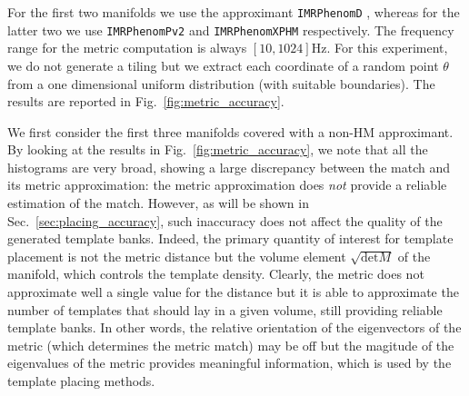 \documentclass[twocolumn,showpacs,preprintnumbers,nofootinbib,prd,
superscriptaddress,10pt]{revtex4-2}
\newcommand{\stefano}[1]{{\textcolor{blue}{\texttt{SS: #1}} }}
\begin{document}
For the first two manifolds we use the approximant \texttt{IMRPhenomD} \cite{PhysRevD.93.044006, PhysRevD.93.044007}, whereas for the latter two we use \texttt{IMRPhenomPv2} \cite{PhysRevLett.113.151101} and \texttt{IMRPhenomXPHM} \cite{PhysRevD.103.104056} respectively.
The frequency range for the metric computation is always $[10, 1024]\text{Hz}$.
For this experiment, we do not generate a tiling but we extract each coordinate of a random point $\theta$ from a one dimensional uniform distribution (with suitable boundaries).
The results are reported in Fig.~\ref{fig:metric_accuracy}.

We first consider the first three manifolds covered with a non-HM approximant.
By looking at the results in Fig.~\ref{fig:metric_accuracy}, we note that all the histograms are very broad, showing a large discrepancy between the match and its metric approximation: the metric approximation does {\it not} provide a reliable estimation of the match. 
However, as will be shown in Sec.~\ref{sec:placing_accuracy}, such inaccuracy does not affect the quality of the generated template banks. Indeed, the primary quantity of interest for template placement is not the metric distance but the volume element $\sqrt{\text{det}M}$ of the manifold, which controls the template density. Clearly, the metric does not approximate well a single value for the distance but it is able to approximate the number of templates that should lay in a given volume, still providing reliable template banks.
In other words, the relative orientation of the eigenvectors of the metric (which determines the metric match) may be off but the magitude of the eigenvalues of the metric provides meaningful information, which is used by the template placing methods.
%
%
\end{document}
